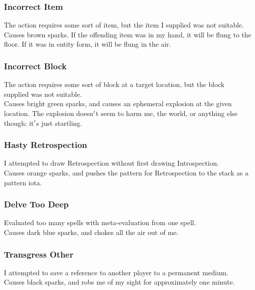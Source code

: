 \documentclass[12pt]{article}
\begin{document}
  \subsubsection*{Incorrect Item}

    The action requires some sort of item, but the item I supplied was not suitable.\\Causes brown sparks. If the offending item was in my hand, it will be flung to the floor. If it was in entity form, it will be flung in the air.\\


  \subsubsection*{Incorrect Block}

    The action requires some sort of block at a target location, but the block supplied was not suitable.\\Causes bright green sparks, and causes an ephemeral explosion at the given location. The explosion doesn$\rq$t seem to harm me, the world, or anything else though; it$\rq$s just startling.\\


  \subsubsection*{Hasty Retrospection}

    I attempted to draw Retrospection without first drawing Introspection.\\Causes orange sparks, and pushes the pattern for Retrospection to the stack as a pattern iota.\\


  \subsubsection*{Delve Too Deep}

    Evaluated too many spells with meta-evaluation from one spell.\\Causes dark blue sparks, and chokes all the air out of me.\\


  \subsubsection*{Transgress Other}

    I attempted to save a reference to another player to a permanent medium.\\Causes black sparks, and robs me of my sight for approximately one minute.\\
\end{document}
